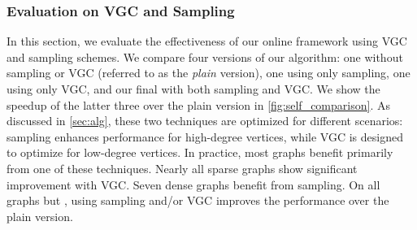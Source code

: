 \subsubsection{Evaluation on VGC and Sampling}

% 




In this section, we evaluate the effectiveness of our online framework using VGC and sampling schemes. 
We compare four versions of our algorithm:
one without sampling or VGC (referred to as the \emph{plain} version), 
one using only sampling, 
one using only VGC, 
and our final with both sampling and VGC.
We show the speedup of the latter three over the plain version in \cref{fig:self_comparison}. 
As discussed in \cref{sec:alg}, 
these two techniques are optimized for different scenarios: 
sampling enhances performance for high-degree vertices, 
while VGC is designed to optimize for low-degree vertices. 
In practice, most graphs benefit primarily from one of these techniques. 
Nearly all sparse graphs show significant improvement with VGC.
Seven dense graphs benefit from sampling.
On all graphs but \HCNS{}, using sampling and/or VGC improves the performance over the plain version. 

